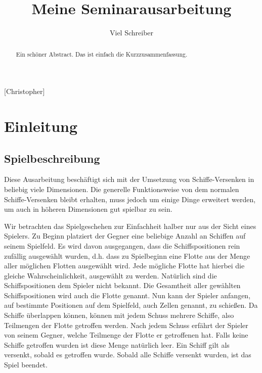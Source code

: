 \documentclass[a4paper,12pt]{llncs}
\numberwithin{equation}{section}
\begin{document}

\author{Viel Schreiber}

\title{Meine Seminarausarbeitung}

\maketitle


\thispagestyle{empty}

\begin{abstract}
Ein schöner Abstract. Das ist einfach die Kurzzusammenfassung.
\end{abstract}

[Christopher]

\section{Einleitung}

\subsection{Spielbeschreibung}
Diese Ausarbeitung beschäftigt sich mit der Umsetzung von Schiffe-Versenken in beliebig viele Dimensionen.
Die generelle Funktionsweise von dem normalen Schiffe-Versenken bleibt erhalten, muss jedoch um einige Dinge erweitert werden, um auch in höheren Dimensionen gut spielbar zu sein.

Wir betrachten das Spielgeschehen zur Einfachheit halber nur aus der Sicht eines Spielers.
Zu Beginn platziert der Gegner eine beliebige Anzahl an Schiffen auf seinem Spielfeld. Es wird davon ausgegangen, dass die Schiffspositionen rein zufällig ausgewählt wurden, d.h. dass zu Spielbeginn eine Flotte aus der Menge aller möglichen Flotten ausgewählt wird. Jede mögliche Flotte hat hierbei die gleiche Wahrscheinlichkeit, ausgewählt zu werden.
Natürlich sind die Schiffspositionen dem Spieler nicht bekannt.
Die Gesamtheit aller gewählten Schiffspositionen wird auch die Flotte genannt.
Nun kann der Spieler anfangen, auf bestimmte Positionen auf dem Spielfeld, auch Zellen genannt, zu schießen.
Da Schiffe überlappen können, können mit jedem Schuss mehrere Schiffe, also Teilmengen der Flotte getroffen werden.
Nach jedem Schuss erfährt der Spieler von seinem Gegner, welche Teilmenge der Flotte er getroffenen hat.
Falls keine Schiffe getroffen wurden ist diese Menge natürlich leer.
Ein Schiff gilt als versenkt, sobald es getroffen wurde.
Sobald alle Schiffe versenkt wurden, ist das Spiel beendet.
\end{document}

